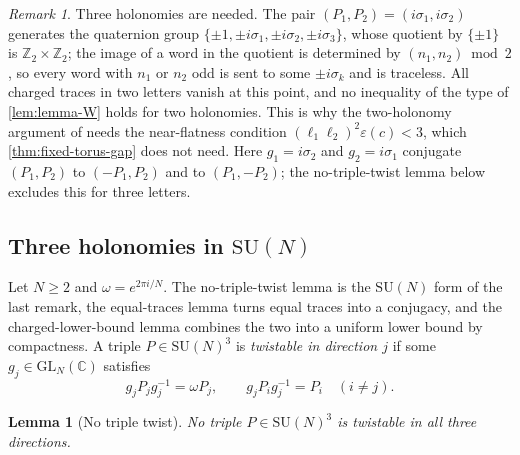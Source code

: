 \documentclass[11pt,a4paper]{amsart}
\newtheorem{lemma}[theorem]{Lemma}
\theoremstyle{definition}
\theoremstyle{remark}
\newtheorem{remark}[theorem]{Remark}
\numberwithin{equation}{section}
\newcommand{\C}{\mathbb{C}}          %
\newcommand{\Z}{\mathbb{Z}}          %
\newcommand{\SU}{\mathrm{SU}}              %
\begin{document}
\begin{remark}
Three holonomies are needed. The pair $(P_1,P_2)=(i\sigma_1,i\sigma_2)$ generates the quaternion group $\{\pm1,\pm i\sigma_1,\pm i\sigma_2,\pm i\sigma_3\}$, whose quotient by $\{\pm1\}$ is $\Z_2\times\Z_2$; the image of a word in the quotient is determined by $(n_1,n_2)\bmod2$, so every word with $n_1$ or $n_2$ odd is sent to some $\pm i\sigma_k$ and is traceless. All charged traces in two letters vanish at this point, and no inequality of the type of \cref{lem:lemma-W} holds for two holonomies. This is why the two-holonomy argument of \cite[Theorem~8]{bhattacharjee2026first} needs the near-flatness condition $(\ell_1\ell_2)^2\varepsilon(c)<3$, which \cref{thm:fixed-torus-gap} does not need. Here $g_1=i\sigma_2$ and $g_2=i\sigma_1$ conjugate $(P_1,P_2)$ to $(-P_1,P_2)$ and to $(P_1,-P_2)$; the no-triple-twist lemma below excludes this for three letters.
\end{remark}

\subsection{Three holonomies in \texorpdfstring{$\SU(N)$}{SU(N)}}
Let $N\ge2$ and $\omega=e^{2\pi i/N}$. The no-triple-twist lemma is the $\SU(N)$ form of the last remark, the equal-traces lemma turns equal traces into a conjugacy, and the charged-lower-bound lemma combines the two into a uniform lower bound by compactness. A triple $P\in\SU(N)^3$ is \emph{twistable in direction $j$} if some $g_j\in\mathrm{GL}_N(\C)$ satisfies
\begin{equation}\label{eq:lw-twist}
g_jP_jg_j^{-1}=\omega P_j,\qquad g_jP_ig_j^{-1}=P_i\quad(i\neq j).
\end{equation}

\begin{lemma}[No triple twist]
No triple $P\in\SU(N)^3$ is twistable in all three directions.
\end{lemma}
\end{document}

